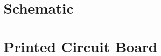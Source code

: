 \documentclass[twoside]{article}
\begin{document}
\begin{appendices}
    \section{Schematic}
        \label{appendix:schematic}
        
    \newpage
    \section{Printed Circuit Board}
        \label{appendix:pcb}
        

\end{appendices}
\end{document}
